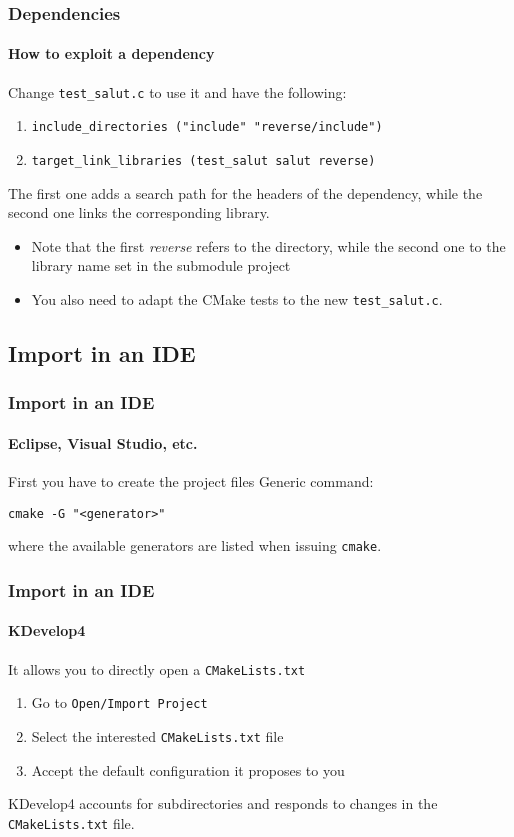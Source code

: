 \begin{frame}
\frametitle{Dependencies}
\framesubtitle{How to exploit a dependency}

\begin{block}{Change \texttt{test\_salut.c} to use it and have the following:}
\begin{enumerate}
\item {\scriptsize \texttt{include\_directories ("include" "reverse/include")}}
\item {\scriptsize \texttt{target\_link\_libraries (test\_salut salut reverse)}}
\end{enumerate}
The first one adds a search path for the headers of the dependency, while the second one links the corresponding library.
\begin{itemize}
\item Note that the first {\em reverse} refers to the directory, while the second one to the library name set in the submodule project
\item You also need to adapt the CMake tests to the new \texttt{test\_salut.c}.
\end{itemize}
\end{block}

\end{frame}

\subsection{Import in an IDE}

\begin{frame}
\frametitle{Import in an IDE}
\framesubtitle{Eclipse, Visual Studio, etc.}

\begin{block}{First you have to create the project files}
Generic command:

\medskip

\texttt{cmake -G "<generator>"}

\medskip

where the available generators are listed when issuing \texttt{cmake}.
\end{block}

\end{frame}

\begin{frame}
\frametitle{Import in an IDE}
\framesubtitle{KDevelop4}

\begin{block}{It allows you to directly open a \texttt{CMakeLists.txt}}
\begin{enumerate}
\item Go to \texttt{Open/Import Project}
\item Select the interested \texttt{CMakeLists.txt} file
\item Accept the default configuration it proposes to you
\end{enumerate}
KDevelop4 accounts for subdirectories and responds to changes in the \texttt{CMakeLists.txt} file.
\end{block}

\end{frame}

